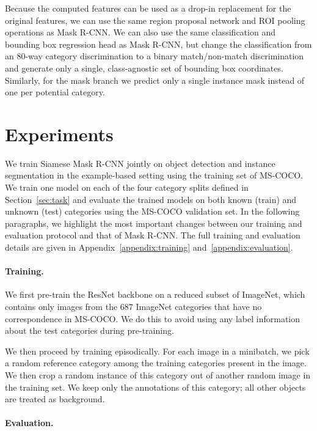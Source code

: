 \documentclass{article}
\newcommand{\coco}{MS-COCO\xspace}
\begin{document}
Because the computed features can be used as a drop-in replacement for the original features, we can use the same region proposal network and ROI pooling operations as Mask R-CNN. We can also use the same classification and bounding box regression head as Mask R-CNN, but change the classification from an 80-way category discrimination to a binary match/non-match discrimination and generate only a single, class-agnostic set of bounding box coordinates. Similarly, for the mask branch we predict only a single instance mask instead of one per potential category.




\section{Experiments}
\label{sec:experiments}

We train Siamese Mask R-CNN jointly on object detection and instance segmentation in the example-based setting using the training set of \coco.
We train one model on each of the four category splits defined in Section~\ref{sec:task} and evaluate the trained models on both known (train) and unknown (test) categories using the \coco validation set. In the following paragraphs, we highlight the most important changes between our training and evaluation protocol and that of Mask R-CNN. The full training and evaluation details are given in Appendix~\ref{appendix:training} and~\ref{appendix:evaluation}.


\paragraph{Training.}
\label{subsec:training}

We first pre-train the ResNet backbone on a reduced subset of ImageNet, which contains only images from the 687 ImageNet categories that have no correspondence in \coco. We do this to avoid using any label information about the test categories during pre-training.

We then proceed by training episodically. For each image in a minibatch, we pick a random reference category among the training categories present in the image. We then crop a random instance of this category out of another random image in the training set. We keep only the annotations of this category; all other objects are treated as background.


\paragraph{Evaluation.}
\end{document}
